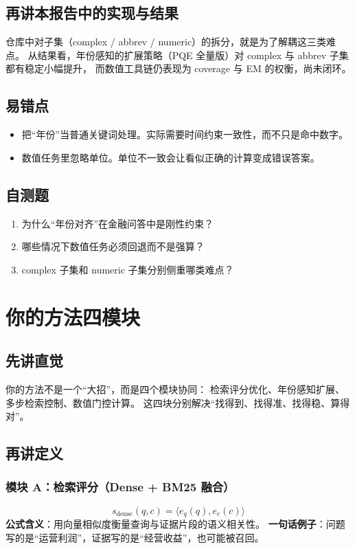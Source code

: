 \documentclass[UTF8,a4paper,12pt]{ctexart}
\begin{document}
\subsection{再讲本报告中的实现与结果}
仓库中对子集（complex / abbrev / numeric）的拆分，就是为了解耦这三类难点。
从结果看，年份感知的扩展策略（PQE 全量版）对 complex 与 abbrev 子集都有稳定小幅提升，
而数值工具链仍表现为 coverage 与 EM 的权衡，尚未闭环。

\subsection{易错点}
\begin{itemize}
  \item 把“年份”当普通关键词处理。实际需要时间约束一致性，而不只是命中数字。
  \item 数值任务里忽略单位。单位不一致会让看似正确的计算变成错误答案。
\end{itemize}

\subsection{自测题}
\begin{enumerate}
  \item 为什么“年份对齐”在金融问答中是刚性约束？
  \item 哪些情况下数值任务必须回退而不是强算？
  \item complex 子集和 numeric 子集分别侧重哪类难点？
\end{enumerate}

\section{你的方法四模块}
\subsection{先讲直觉}
你的方法不是一个“大招”，而是四个模块协同：
检索评分优化、年份感知扩展、多步检索控制、数值门控计算。
这四块分别解决“找得到、找得准、找得稳、算得对”。

\subsection{再讲定义}
\subsubsection*{模块 A：检索评分（Dense + BM25 融合）}
\begin{equation}
s_{\text{dense}}(q,c)=\langle e_q(q),e_c(c)\rangle
\end{equation}
\textbf{公式含义}：用向量相似度衡量查询与证据片段的语义相关性。  
\textbf{一句话例子}：问题写的是“运营利润”，证据写的是“经营收益”，也可能被召回。
\end{document}
